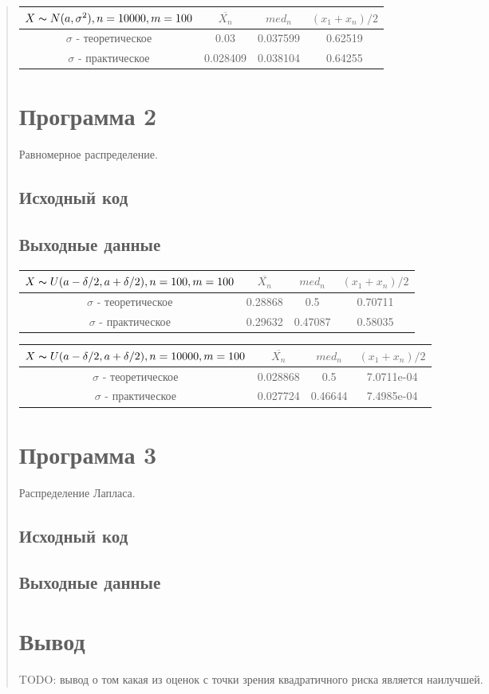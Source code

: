 \documentclass{article}
\begin{document}
\begin{quote}
\begin{tabular}{ | c | c | c | c | }
\hline
$X \thicksim N(a, \sigma^2), n = 10000, m = 100$ & $\overline{X_n}$ & $med_n$ & $(x_1 + x_n) / 2$ \\ \hline
$\sigma$ - теоретическое & 0.03 & 0.037599 & 0.62519 \\ \hline
$\sigma$ - практическое & 0.028409 & 0.038104 & 0.64255 \\
\hline
\end{tabular}
\section{Программа 2}
	Равномерное распределение. \\
\subsection{Исходный код}
	
\subsection{Выходные данные}
\begin{tabular}{ | c | c | c | c | }
\hline
$X \thicksim U(a - \delta / 2, a + \delta / 2), n = 100, m = 100$ & $\overline{X_n}$ & $med_n$ & $(x_1 + x_n) / 2$ \\ \hline
$\sigma$ - теоретическое & 0.28868 & 0.5 & 0.70711 \\ \hline
$\sigma$ - практическое & 0.29632 & 0.47087 & 0.58035 \\
\hline
\end{tabular}

\begin{tabular}{ | c | c | c | c | } 
\hline
$X \thicksim U(a - \delta / 2, a + \delta / 2), n = 10000, m = 100$ & $\overline{X_n}$ & $med_n$ & $(x_1 + x_n) / 2$ \\ \hline
$\sigma$ - теоретическое & 0.028868 & 0.5 & 7.0711e-04 \\ \hline
$\sigma$ - практическое & 0.027724 & 0.46644 & 7.4985e-04 \\
\hline
\end{tabular}
\section{Программа 3}
        Распределение Лапласа. \\
\subsection{Исходный код}
        
\subsection{Выходные данные}
\section{Вывод}
	TODO: вывод о том какая из оценок с точки зрения квадратичного риска является наилучшей.
\end{quote}
\end{document}
